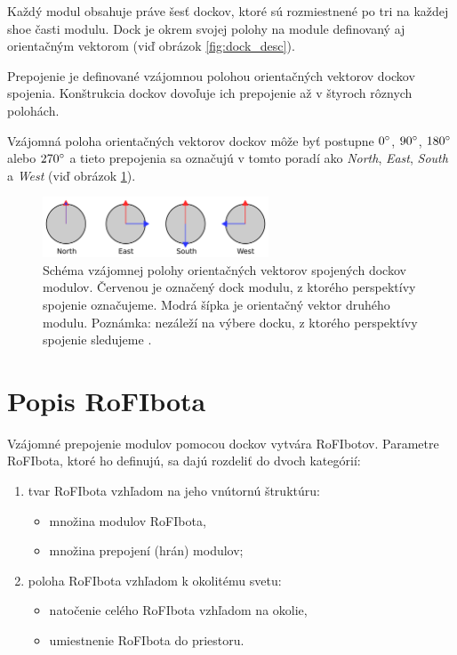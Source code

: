 \documentclass[
  digital, %
  oneside, %
  table,   %
  lof,     %
  nolot,     %
]{fithesis3}
\begin{document}
Každý modul obsahuje práve šesť dockov, ktoré sú rozmiestnené po tri na každej shoe časti modulu. Dock je okrem svojej polohy na module definovaný aj orientačným vektorom (viď obrázok \ref{fig:dock_desc}). 

Prepojenie je definované vzájomnou polohou orientačných vektorov dockov spojenia. Konštrukcia dockov dovoľuje ich prepojenie až v štyroch rôznych polohách. 

Vzájomná poloha orientačných vektorov dockov môže byť postupne $0\degree$, $90\degree$, $180\degree$ alebo $270\degree$ a tieto prepojenia sa označujú v tomto poradí ako \textit{North}, \textit{East}, \textit{South} a \textit{West} (viď obrázok \ref{fig:dock_orientation}). 

\begin{figure}[hbt!]
    \centering
    \includegraphics[width=0.6\textwidth]{pictures/dock_orientation.pdf}
    \caption[Poloha prepojenia dockov modulu]{Schéma vzájomnej polohy orientačných vektorov spojených dockov modulov. Červenou je označený dock modulu, z ktorého perspektívy spojenie označujeme. Modrá šípka je orientačný vektor druhého modulu. Poznámka: nezáleží na výbere docku, z ktorého perspektívy spojenie sledujeme \cite{mrazekMasterThesis}.}
    \label{fig:dock_orientation}
\end{figure}

\section{Popis RoFIbota}
\label{sec:rofibotSpec}
Vzájomné prepojenie modulov pomocou dockov vytvára RoFIbotov. Parametre RoFIbota, ktoré ho definujú, sa dajú rozdeliť do dvoch kategórií:   
\begin{enumerate}
    \item tvar RoFIbota vzhľadom na jeho vnútornú štruktúru: 
    \begin{itemize}
        \item množina modulov RoFIbota, 
        \item množina prepojení (hrán) modulov; 
    \end{itemize}
    \item poloha RoFIbota vzhľadom k okolitému svetu: 
    \begin{itemize}
        \item natočenie celého RoFIbota vzhľadom na okolie, 
        \item umiestnenie RoFIbota do priestoru.  
    \end{itemize}
\end{enumerate}
\end{document}
